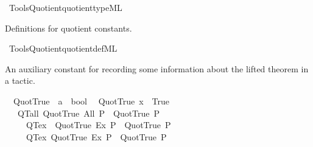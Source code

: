\begin{isabellebody}
\begin{isamarkuptext}
\end{isamarkuptext}\isamarkuptrue%
%
\isadelimML
%
\endisadelimML
%
\isatagML
{}\isamarkupfalse%
\ {\isacartoucheopen}Tools{\isacharslash}{\kern0pt}Quotient{\isacharslash}{\kern0pt}quotient{\isacharunderscore}{\kern0pt}type{\isachardot}{\kern0pt}ML{\isacartoucheclose}%
\endisatagML
{\isafoldML}%
%
\isadelimML
%
\endisadelimML
%
\begin{isamarkuptext}%
Definitions for quotient constants.%
\end{isamarkuptext}\isamarkuptrue%
%
\isadelimML
%
\endisadelimML
%
\isatagML
{}\isamarkupfalse%
\ {\isacartoucheopen}Tools{\isacharslash}{\kern0pt}Quotient{\isacharslash}{\kern0pt}quotient{\isacharunderscore}{\kern0pt}def{\isachardot}{\kern0pt}ML{\isacartoucheclose}%
\endisatagML
{\isafoldML}%
%
\isadelimML
%
\endisadelimML
%
\begin{isamarkuptext}%
An auxiliary constant for recording some information
  about the lifted theorem in a tactic.%
\end{isamarkuptext}\isamarkuptrue%
\isamarkupfalse%
\isanewline
\ \ Quot{\isacharunderscore}{\kern0pt}True\ {\isacharcolon}{\kern0pt}{\isacharcolon}{\kern0pt}\ {\isachardoublequoteopen}{\isacharprime}{\kern0pt}a\ {\isasymRightarrow}\ bool{\isachardoublequoteclose}\isanewline
{}\isanewline
\ \ {\isachardoublequoteopen}Quot{\isacharunderscore}{\kern0pt}True\ x\ {\isasymlongleftrightarrow}\ True{\isachardoublequoteclose}\isanewline
\isanewline
{}\isamarkupfalse%
\isanewline
\ \ \ QT{\isacharunderscore}{\kern0pt}all{\isacharcolon}{\kern0pt}\ {\isachardoublequoteopen}Quot{\isacharunderscore}{\kern0pt}True\ {\isacharparenleft}{\kern0pt}All\ P{\isacharparenright}{\kern0pt}\ {\isasymLongrightarrow}\ Quot{\isacharunderscore}{\kern0pt}True\ P{\isachardoublequoteclose}\isanewline
\ \ \ \ \ QT{\isacharunderscore}{\kern0pt}ex{\isacharcolon}{\kern0pt}\ \ {\isachardoublequoteopen}Quot{\isacharunderscore}{\kern0pt}True\ {\isacharparenleft}{\kern0pt}Ex\ P{\isacharparenright}{\kern0pt}\ {\isasymLongrightarrow}\ Quot{\isacharunderscore}{\kern0pt}True\ P{\isachardoublequoteclose}\isanewline
\ \ \ \ \ QT{\isacharunderscore}{\kern0pt}ex{}{\isacharcolon}{\kern0pt}\ {\isachardoublequoteopen}Quot{\isacharunderscore}{\kern0pt}True\ {\isacharparenleft}{\kern0pt}Ex{}\ P{\isacharparenright}{\kern0pt}\ {\isasymLongrightarrow}\ Quot{\isacharunderscore}{\kern0pt}True\ P{\isachardoublequoteclose}\isanewline

\end{isabellebody}
